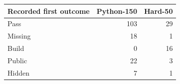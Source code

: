 \begin{tabular}{lrr}
\toprule
\textbf{Recorded first outcome} & \textbf{Python-150} & \textbf{Hard-50} \\
\midrule
Pass & 103 & 29 \\
Missing & 18 & 1 \\
Build & 0 & 16 \\
Public & 22 & 3 \\
Hidden & 7 & 1 \\
\bottomrule
\end{tabular}
